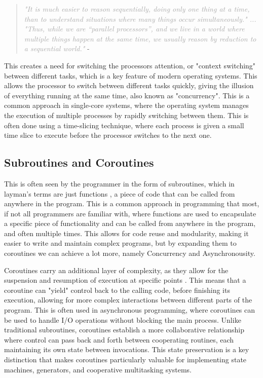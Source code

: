 \documentclass[12pt,a4paper]{article}
\begin{document}
\begin{quote}
    \textit{\textcolor{darkgray}{"It is much easier to reason sequentially, doing only one thing at a time, than to understand situations where many things occur simultaneously." ... "Thus, while we are “parallel processors”, and we live in a world where multiple things happen at the same time, we usually reason by reduction to a sequential world."}} - \cite{Rajsbaum2020}
\end{quote}

This creates a need for switching the processors attention, or "context switching" between different tasks, which is a key feature of modern operating systems. This allows the processor to switch between different tasks quickly, giving the illusion of everything running at the same time, also known as "concurrency"\parencite{Rajsbaum2020}. This is a common approach in single-core systems, where the operating system manages the execution of multiple processes by rapidly switching between them. This is often done using a time-slicing technique, where each process is given a small time slice to execute before the processor switches to the next one.

\subsection{Subroutines and Coroutines}

This is often seen by the programmer in the form of subroutines, which in layman's terms are just functions \parencite{Pyeatt2020}, a piece of code that can be called from anywhere in the program. This is a common approach in programming that most, if not all programmers are familiar with, where functions are used to encapsulate a specific piece of functionality and can be called from anywhere in the program, and often multiple times. This allows for code reuse and modularity, making it easier to write and maintain complex programs, but by expanding them to coroutines we can achieve a lot more, namely Concurrency and Asynchronousity. 

Coroutines carry an additional layer of complexity, as they allow for the suspension and resumption of execution at specific points \parencite{DeMouna2009}. This means that a coroutine can "yield" control back to the calling code, before finishing its execution, allowing for more complex interactions between different parts of the program. This is often used in asynchronous programming, where coroutines can be used to handle I/O operations without blocking the main process. Unlike traditional subroutines, coroutines establish a more collaborative relationship where control can pass back and forth between cooperating routines, each maintaining its own state between invocations. This state preservation is a key distinction that makes coroutines particularly valuable for implementing state machines, generators, and cooperative multitasking systems.
\end{document}
